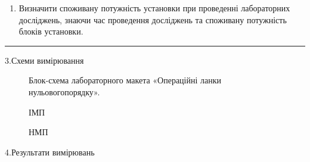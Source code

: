 \documentclass[14pt,a4paper]{scrartcl}
\begin{document}
\begin{enumerate}
 $U_{11}$ знімається з виходу КТ3,\\

$U_{12}(t)=
\begin{cases}
1& \text{при } t_1\le t\le (t_1+t_u)\\
0& \text{при} (t_1+t_u)\le t\le (t_1+t_u+t_n)
\end{cases}
$-знімається з виходу КТ7,\\

$U_2$ знімається з виходу КТ3.\\

Для зазначених трьох підсилювачів (ДМП, ІСП, НСП) записати
аналітичний вираз для вихідної напруги $U_2(t)$ у символьному вигляді та
чисельно і порівняти результати вимірювань з розрахунками, зробити
висновки по кожному пункту досліджень.\\
Тут $U_{1m}$--- амплітуда вхідного сигналу $U_{11}$, $U_{2m}$---максимальне значення вхідного сигналу $U_{12}$, T--- період вхідного сигналу $U_{11}$, $t_u$--- тривалість імпульсу вхідного сигналу $U_{12}$, $t_n$--- тривалість паузи вхідного сигналу $U_{12}$.
\item Визначити споживану потужність установки при проведенні
лабораторних досліджень, знаючи час проведення досліджень та
споживану потужність блоків установки.
\end{enumerate}
\medskip\hrule\medskip
\newpage 
\begin{center}
{\Large 3.Схеми вимірювання}
\end{center}

\begin{figure}[h]
\center{\texttt{[image: op2]}}
\caption{Блок-схема лабораторного макета «Операційні ланки нульовогопорядку».}
\end{figure}

\begin{figure}[h]
\center{\texttt{[image: op]}}
\caption{ІМП}
\end{figure}

\begin{figure}[h]
\center{\texttt{[image: op1]}}
\caption{НМП}
\end{figure}
\newpage

\begin{center}
{\Large 4.Результати вимірювань}
\end{center}
\end{document}
